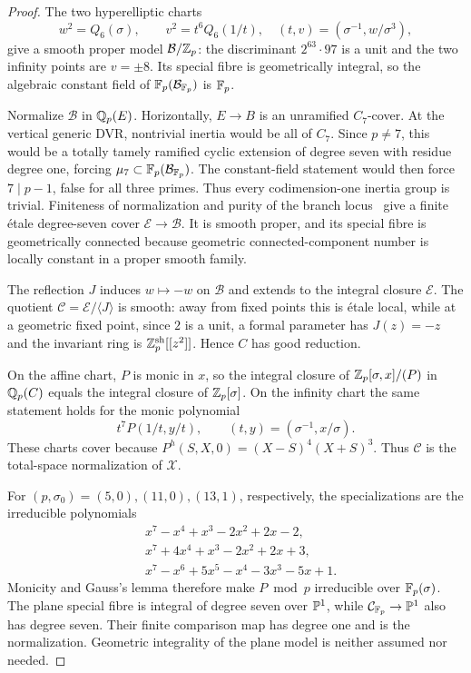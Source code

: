 \begin{proof}
The two hyperelliptic charts
\[
 w^2=Q_6(\sigma),\qquad
 v^2=t^6Q_6(1/t),\quad (t,v)=(\sigma^{-1},w/\sigma^3),
\]
give a smooth proper model $\mathcal B/\mathbb Z_p$: the discriminant
$2^{63}\cdot97$ is a unit and the two infinity points are $v=\pm8$.
Its special fibre is geometrically integral, so the algebraic constant field
of $\mathbb F_p(\mathcal B_{\mathbb F_p})$ is $\mathbb F_p$.

Normalize $\mathcal B$ in $\mathbb Q_p(E)$.  Horizontally, $E\to B$ is an
unramified $C_7$-cover.  At the vertical generic DVR, nontrivial inertia would
be all of $C_7$.  Since $p\ne7$, this would be a totally tamely ramified
cyclic extension of degree seven with residue degree one, forcing
$\mu_7\subset\mathbb F_p(\mathcal B_{\mathbb F_p})$.  The constant-field statement would
then force $7\mid p-1$, false for all three primes.  Thus every
codimension-one inertia group is trivial.  Finiteness of normalization and
purity of the branch locus~\cite{stacks-purity} give a finite \'{e}tale
degree-seven cover $\mathcal E\to\mathcal B$.  It is smooth proper, and its
special fibre is geometrically connected because geometric connected-component
number is locally constant in a proper smooth family.

The reflection $J$ induces $w\mapsto-w$ on $\mathcal B$ and extends to the
integral closure $\mathcal E$.  The quotient
$\mathcal C=\mathcal E/\langle J\rangle$ is smooth: away from fixed points
this is \'{e}tale local, while at a geometric fixed point, since $2$ is a
unit, a formal parameter has $J(z)=-z$ and the invariant ring is
$\mathbb Z_p^{\rm sh}[[z^2]]$.  Hence $C$ has good reduction.

On the affine chart, $P$ is monic in $x$, so the integral closure of
$\mathbb Z_p[\sigma,x]/(P)$ in $\mathbb Q_p(C)$ equals the integral closure of
$\mathbb Z_p[\sigma]$.  On the infinity chart the same statement holds for the
monic polynomial
\[
 t^7P(1/t,y/t),\qquad (t,y)=(\sigma^{-1},x/\sigma).
\]
These charts cover because
$P^h(S,X,0)=(X-S)^4(X+S)^3$.  Thus $\mathcal C$ is the total-space
normalization of $\mathcal X$.

For $(p,\sigma_0)=(5,0),(11,0),(13,1)$, respectively, the specializations
are the irreducible polynomials
\[
\begin{split}
&x^7-x^4+x^3-2x^2+2x-2,\\
&x^7+4x^4+x^3-2x^2+2x+3,\\
&x^7-x^6+5x^5-x^4-3x^3-5x+1.
\end{split}
\]
Monicity and Gauss's lemma therefore make $P\bmod p$ irreducible over
$\mathbb F_p(\sigma)$.  The plane special fibre is integral of degree seven over
$\mathbb P^1$, while $\mathcal C_{\mathbb F_p}\to\mathbb P^1$ also has degree seven.  Their
finite comparison map has degree one and is the normalization.  Geometric
integrality of the plane model is neither assumed nor needed.


\end{proof}
